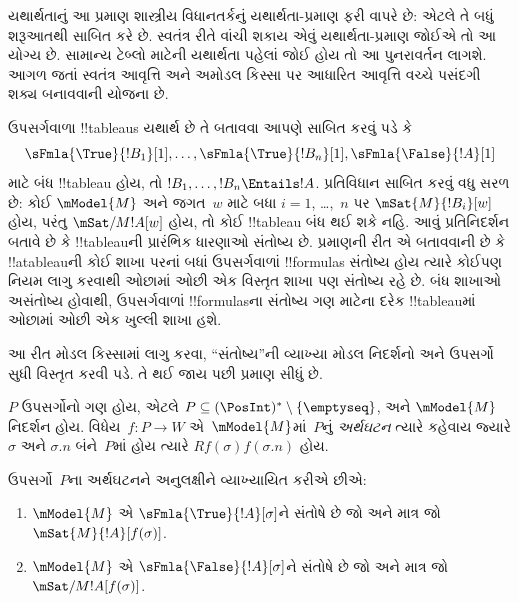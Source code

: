 \documentclass[../../../include/open-logic-section]{subfiles}
\begin{document}


\begin{editorial}
  યથાર્થતાનું આ પ્રમાણ શાસ્ત્રીય વિધાનતર્કનું યથાર્થતા-પ્રમાણ ફરી
  વાપરે છે: એટલે તે બધું શરૂઆતથી સાબિત કરે છે. સ્વતંત્ર રીતે
  વાંચી શકાય એવું યથાર્થતા-પ્રમાણ જોઈએ તો આ યોગ્ય છે. સામાન્ય
  ટેબ્લો માટેની યથાર્થતા પહેલાં જોઈ હોય તો આ પુનરાવર્તન લાગશે.
  આગળ જતાં સ્વતંત્ર આવૃત્તિ અને અમોડલ કિસ્સા પર આધારિત આવૃત્તિ
  વચ્ચે પસંદગી શક્ય બનાવવાની યોજના છે.
\end{editorial}

\begin{explain}
  ઉપસર્ગવાળા !!{tableau}s યથાર્થ છે તે બતાવવા આપણે સાબિત કરવું પડે કે
  \[
  \sFmla{\True}{!B_1}[1], \dots, \sFmla{\True}{!B_n}[1], \sFmla{\False}{!A}[1]
  \]
  માટે બંધ !!{tableau} હોય, તો $!B_1, \dots, !B_n \Entails !A$.
  પ્રતિવિધાન સાબિત કરવું વધુ સરળ છે: કોઈ $\mModel{M}$ અને
  જગત~$w$ માટે બધા $i=1$, \dots,~$n$ પર
  $\mSat{M}{!B_i}[w]$ હોય, પરંતુ
  $\mSat/{M}{!A}[w]$ હોય, તો કોઈ !!{tableau} બંધ થઈ શકે નહિ.
  આવું પ્રતિનિદર્શન બતાવે છે કે !!{tableau}ની પ્રારંભિક ધારણાઓ
  સંતોષ્ય છે. પ્રમાણની રીત એ બતાવવાની છે કે !!a{tableau}ની કોઈ
  શાખા પરનાં બધાં ઉપસર્ગવાળાં !!{formula}s સંતોષ્ય હોય ત્યારે
  કોઈપણ નિયમ લાગુ કરવાથી ઓછામાં ઓછી એક વિસ્તૃત શાખા પણ
  સંતોષ્ય રહે છે. બંધ શાખાઓ અસંતોષ્ય હોવાથી, ઉપસર્ગવાળાં
  !!{formula}sના સંતોષ્ય ગણ માટેના દરેક !!{tableau}માં
  ઓછામાં ઓછી એક ખુલ્લી શાખા હશે.

  આ રીત મોડલ કિસ્સામાં લાગુ કરવા, ``સંતોષ્ય''ની વ્યાખ્યા
  મોડલ નિદર્શનો અને ઉપસર્ગો સુધી વિસ્તૃત કરવી પડે. તે થઈ જાય
  પછી પ્રમાણ સીધું છે.
\end{explain}

\begin{defn}
  $P$ ઉપસર્ગોનો ગણ હોય, એટલે $P \subseteq (\PosInt)^*
  \setminus \{\emptyseq\}$, અને $\mModel{M}$ નિદર્શન હોય.
  વિધેય~$f\colon P \to W$ એ~$\mModel{M}$માં~$P$નું
  \emph{અર્થઘટન} ત્યારે કહેવાય જ્યારે $\sigma$ અને $\sigma.n$
  બંને~$P$માં હોય ત્યારે $Rf(\sigma)f(\sigma.n)$ હોય.

  ઉપસર્ગો~$P$ના અર્થઘટનને અનુલક્ષીને વ્યાખ્યાયિત કરીએ છીએ:
  \begin{enumerate}
  \item $\mModel{M}$ એ $\sFmla{\True}{!A}[\sigma]$ને સંતોષે છે
    જો અને માત્ર જો
    $\mSat{M}{!A}[f(\sigma)]$.
  \item $\mModel{M}$ એ $\sFmla{\False}{!A}[\sigma]$ને સંતોષે છે
    જો અને માત્ર જો
    $\mSat/{M}{!A}[f(\sigma)]$.
  \end{enumerate}
\end{defn}
\end{document}
